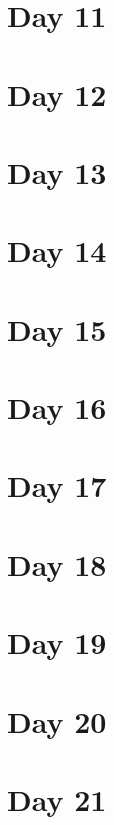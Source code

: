 \documentclass[]{book}
\begin{document}
\hypertarget{day-11}{%
\chapter{Day 11}\label{day-11}}

\hypertarget{day-12}{%
\chapter{Day 12}\label{day-12}}

\hypertarget{day-13}{%
\chapter{Day 13}\label{day-13}}

\hypertarget{day-14}{%
\chapter{Day 14}\label{day-14}}

\hypertarget{day-15}{%
\chapter{Day 15}\label{day-15}}

\hypertarget{day-16}{%
\chapter{Day 16}\label{day-16}}

\hypertarget{day-17}{%
\chapter{Day 17}\label{day-17}}

\hypertarget{day-18}{%
\chapter{Day 18}\label{day-18}}

\hypertarget{day-19}{%
\chapter{Day 19}\label{day-19}}

\hypertarget{day-20}{%
\chapter{Day 20}\label{day-20}}

\hypertarget{day-21}{%
\chapter{Day 21}\label{day-21}}
\end{document}
